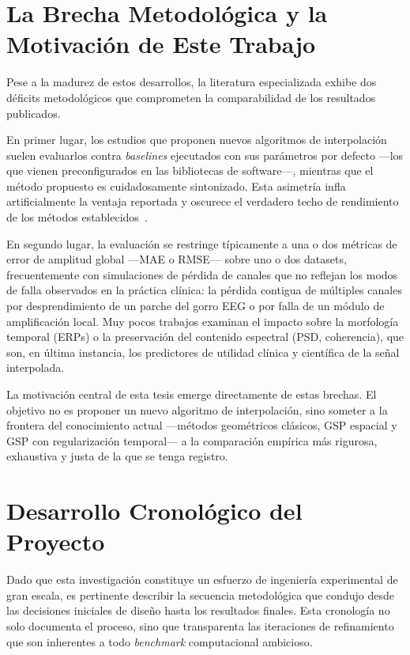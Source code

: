 \section{La Brecha Metodológica y la Motivación de Este Trabajo}

Pese a la madurez de estos desarrollos, la literatura especializada exhibe dos déficits metodológicos que comprometen la comparabilidad de los resultados publicados.

En primer lugar, los estudios que proponen nuevos algoritmos de interpolación suelen evaluarlos contra \textit{baselines} ejecutados con sus parámetros por defecto —los que vienen preconfigurados en las bibliotecas de software—, mientras que el método propuesto es cuidadosamente sintonizado. Esta asimetría infla artificialmente la ventaja reportada y oscurece el verdadero techo de rendimiento de los métodos establecidos~\cite{calazans_machine_2024}.

En segundo lugar, la evaluación se restringe típicamente a una o dos métricas de error de amplitud global —MAE o RMSE— sobre uno o dos datasets, frecuentemente con simulaciones de pérdida de canales que no reflejan los modos de falla observados en la práctica clínica: la pérdida contigua de múltiples canales por desprendimiento de un parche del gorro EEG o por falla de un módulo de amplificación local. Muy pocos trabajos examinan el impacto sobre la morfología temporal (ERPs) o la preservación del contenido espectral (PSD, coherencia), que son, en última instancia, los predictores de utilidad clínica y científica de la señal interpolada.

La motivación central de esta tesis emerge directamente de estas brechas. El objetivo no es proponer un nuevo algoritmo de interpolación, sino someter a la frontera del conocimiento actual —métodos geométricos clásicos, GSP espacial y GSP con regularización temporal— a la comparación empírica más rigurosa, exhaustiva y justa de la que se tenga registro.

\section{Desarrollo Cronológico del Proyecto}

Dado que esta investigación constituye un esfuerzo de ingeniería experimental de gran escala, es pertinente describir la secuencia metodológica que condujo desde las decisiones iniciales de diseño hasta los resultados finales. Esta cronología no solo documenta el proceso, sino que transparenta las iteraciones de refinamiento que son inherentes a todo \textit{benchmark} computacional ambicioso.


